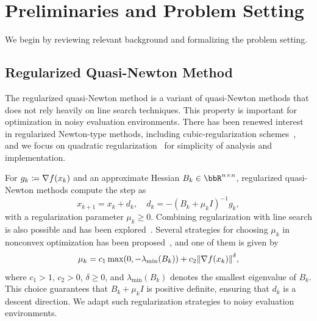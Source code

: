 \documentclass[journal]{subfiles}
\begin{document}
\providecommand{\resultsNoiseMainWidth}{0.9}
\providecommand{\resultsNoiseLegendWidth}{0.8}
\providecommand{\resultsAllPrecisionsSubfigWidth}{0.32}

\section{Preliminaries and Problem Setting}
\label{sec:preliminaries}

We begin by reviewing relevant background and formalizing the problem setting.

\subsection{Regularized Quasi-Newton Method}
\label{sec:prel_rqn}

The regularized quasi-Newton method is a variant of quasi-Newton methods that does not rely heavily on line search techniques. This property is important for optimization in noisy evaluation environments.
There has been renewed interest in regularized Newton-type methods, including cubic-regularization schemes~\citep{nesterovCubicRegularizationNewton2006a,ranganathSymmetricRankOneQuasiNewton2025,wangConvergenceRatesRegularized2025}, and we focus on quadratic regularization~\citep{kanzowRegularizationLimitedMemory2023,doikovSuperUniversalRegularizedNewton2024,liTruncatedRegularizedNewton2009,zhangNewRegularizedQuasiNewton2018,uedaConvergencePropertiesRegularized2010,uedaRegularizedNewtonMethod2014,shengNewAdaptiveTrust2018} for simplicity of analysis and implementation.

For $g_k \coloneqq \nabla f(x_k)$ and an approximate Hessian $B_k \in \bbR^{n \times n}$, regularized quasi-Newton methods compute the step as
\begin{equation*}
    x_{k+1} = x_k + d_k, \quad d_k = -(B_k + \mu_k I)^{-1} g_k,
\end{equation*}
with a regularization parameter $\mu_k \ge 0$.
Combining regularization with line search is also possible and has been explored~\citep{uedaConvergencePropertiesRegularized2010}.
Several strategies for choosing $\mu_k$ in nonconvex optimization has been proposed~\citep{uedaConvergencePropertiesRegularized2010,uedaRegularizedNewtonMethod2014,shengNewAdaptiveTrust2018}, and one of them is given by
\begin{equation*}
    \mu_k = c_1 \max(0, -\lambda_{\min}(B_k)) + c_2 \norm{\nabla f(x_k)}^\delta, \label{eq:ueda_mu}
\end{equation*}
where $c_1 > 1$, $c_2 > 0$, $\delta \ge 0$, and $\lambda_{\min}(B_k)$ denotes the smallest eigenvalue of $B_k$.
This choice guarantees that $B_k + \mu_k I$ is positive definite, ensuring that $d_k$ is a descent direction.
We adapt such regularization strategies to noisy evaluation environments.
\end{document}
